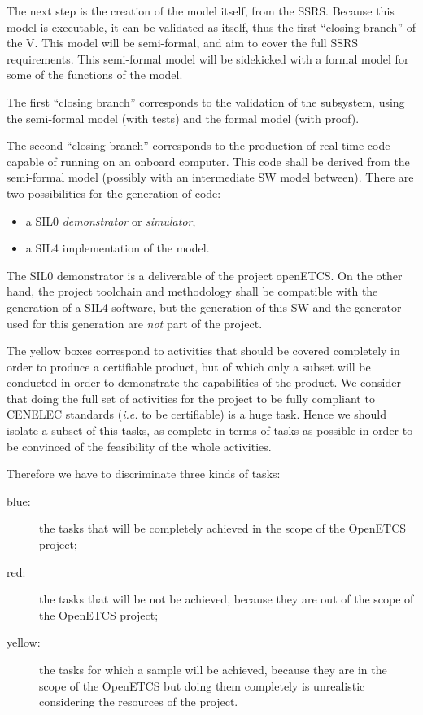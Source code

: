 \documentclass{template/openetcs_article}
\begin{document}
The next step is the creation of the model itself, from the SSRS. Because this model is executable, 
it can be validated as itself, thus the first ``closing branch'' of the V. This model will be 
semi-formal, and aim to cover the full SSRS requirements. This semi-formal model will be sidekicked with 
a formal model for some of the functions of the model.

The first ``closing branch'' corresponds to the validation of the subsystem, using the semi-formal model
(with tests) and the formal model (with proof).

The second ``closing branch'' corresponds to the production of real time code capable of running on an 
onboard computer. This code shall be derived from the semi-formal model (possibly with an intermediate
SW model between). There are two possibilities for the generation of code:
\begin{itemize}
\item a SIL0 \emph{demonstrator} or \emph{simulator},
\item a SIL4 implementation of the model.
\end{itemize}

The SIL0 demonstrator is a deliverable of the project openETCS. On the other hand, the project toolchain and 
methodology shall be compatible with the generation of a SIL4 software, but the generation of this SW 
and the generator used for this generation are \emph{not} part of the project.

The yellow boxes correspond to activities that should be covered completely in order to produce 
a certifiable product, but of which only a subset will be conducted in order to demonstrate the 
capabilities of the product. We consider that doing the full set of activities for the project to 
be fully compliant to CENELEC standards (\emph{i.e.} to be certifiable) is a huge task. Hence we 
should isolate a subset of this tasks, as complete in terms of tasks as possible in order to be 
convinced of the feasibility of the whole activities. 

Therefore we have to discriminate three kinds of tasks:
\begin{description}
\item[blue:] the tasks that will be completely achieved in the scope of the OpenETCS project;
\item[red:] the tasks that will be not be achieved, because they are out of the scope of the OpenETCS project;
\item[yellow:] the tasks for which a sample will be achieved, because they are in the scope of the 
OpenETCS but doing them completely is unrealistic considering the resources of the project.
\end{description}
\end{document}
